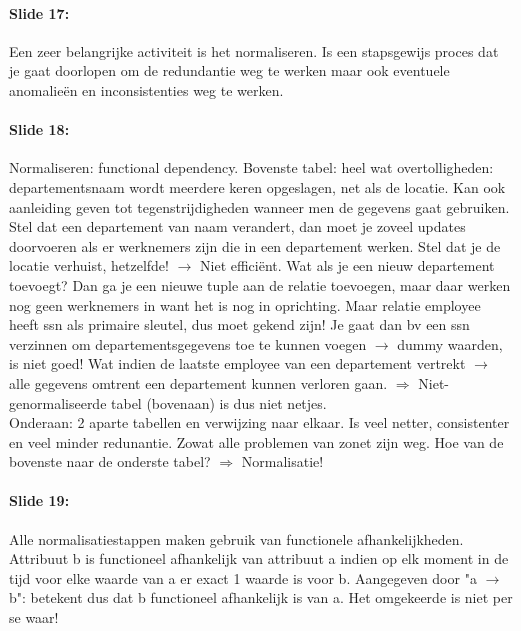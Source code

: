 \documentclass[10pt,a4paper]{report}
\begin{document}
\paragraph{Slide 17:}Een zeer belangrijke activiteit is het normaliseren. Is een stapsgewijs proces dat je gaat doorlopen om de redundantie weg te werken maar ook eventuele anomalieën en inconsistenties weg te werken.

\paragraph{Slide 18:}Normaliseren: functional dependency. Bovenste tabel: heel wat overtolligheden: departementsnaam wordt meerdere keren opgeslagen, net als de locatie. Kan ook aanleiding geven tot tegenstrijdigheden wanneer men de gegevens gaat gebruiken. Stel dat een departement van naam verandert, dan moet je zoveel updates doorvoeren als er werknemers zijn die in een departement werken. Stel dat je de locatie verhuist, hetzelfde! $\rightarrow$ Niet efficiënt. Wat als je een nieuw departement toevoegt? Dan ga je een nieuwe tuple aan de relatie toevoegen, maar daar werken nog geen werknemers in want het is nog in oprichting. Maar relatie employee heeft ssn als primaire sleutel, dus moet gekend zijn! Je gaat dan bv een ssn verzinnen om departementsgegevens toe te kunnen voegen $\rightarrow$ dummy waarden, is niet goed! Wat indien de laatste employee van een departement vertrekt $\rightarrow$ alle gegevens omtrent een departement kunnen verloren gaan. $\Rightarrow$ Niet-genormaliseerde tabel (bovenaan) is dus niet netjes.\\
Onderaan: 2 aparte tabellen en verwijzing naar elkaar. Is veel netter, consistenter en veel minder redunantie. Zowat alle problemen van zonet zijn weg. Hoe van de bovenste naar de onderste tabel? $\Rightarrow$ Normalisatie!

\paragraph{Slide 19:}Alle normalisatiestappen maken gebruik van functionele afhankelijkheden. Attribuut b is functioneel afhankelijk van attribuut a indien op elk moment in de tijd voor elke waarde van a er exact 1 waarde is voor b. Aangegeven door "a $\rightarrow$ b": betekent dus dat b functioneel afhankelijk is van a. Het omgekeerde is niet per se waar!
\end{document}
